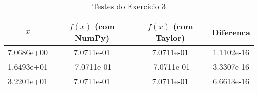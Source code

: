 
    \begin{table}[h!]
    \centering
    \caption{Testes do Exercicio 3}
    \begin{tabular}{|c|c|c|c|}
    \toprule
    \textbf{$x$} & \textbf{$f(x)$ (com NumPy)} & \textbf{$f(x)$ (com Taylor)} & \textbf{Diferenca} \\
    \midrule   
    7.0686e+00 & 7.0711e-01 & 7.0711e-01 & 1.1102e-16 \\
                            1.6493e+01 & -7.0711e-01 & -7.0711e-01 & 3.3307e-16 \\
                            3.2201e+01 & 7.0711e-01 & 7.0711e-01 & 6.6613e-16 \\
                            
    \bottomrule
    \end{tabular}
    \end{table}    
    